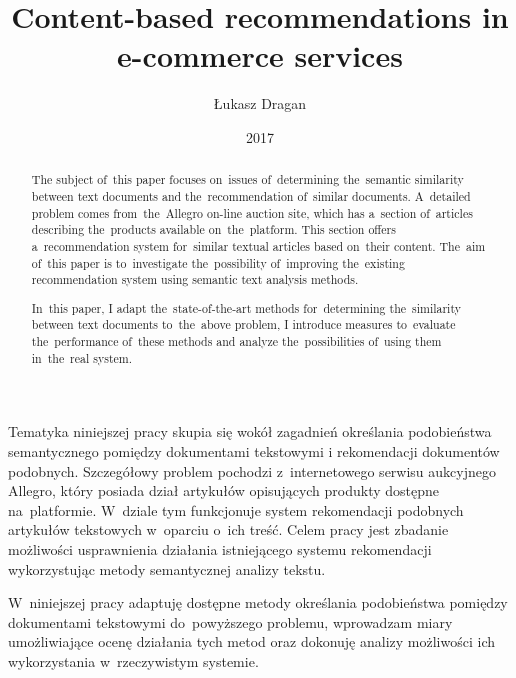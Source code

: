 \documentclass[pl]{minipw} %
\title{Content-based recommendations in e-commerce services} %
\author{Łukasz Dragan}
\date{2017}
\begin{document}
\sloppy






\setcounter{page}{1}


\begin{streszczenie}

	Tematyka niniejszej pracy skupia się wokół zagadnień określania podobieństwa semantycznego pomiędzy dokumentami tekstowymi i rekomendacji dokumentów podobnych. Szczegółowy problem pochodzi z~internetowego serwisu aukcyjnego Allegro, który posiada dział artykułów opisujących produkty dostępne na~platformie. W~dziale tym funkcjonuje system rekomendacji podobnych artykułów tekstowych w~oparciu o~ich treść. Celem pracy jest zbadanie możliwości usprawnienia działania istniejącego systemu rekomendacji wykorzystując metody semantycznej analizy tekstu.
	
	W~niniejszej pracy adaptuję dostępne metody określania podobieństwa pomiędzy dokumentami tekstowymi do~powyższego problemu, wprowadzam miary umożliwiające ocenę działania tych metod oraz dokonuję analizy możliwości ich wykorzystania w~rzeczywistym systemie.
	
\end{streszczenie}


\begin{abstract}

	The subject of~this paper focuses on~issues of~determining the~semantic similarity between text documents and the~recommendation of~similar documents. A~detailed problem comes from~the~Allegro on-line auction site, which has a~section of~articles describing the~products available on~the~platform. This section offers a~recommendation system for~similar textual articles based on~their content. The~aim of~this paper is to~investigate the~possibility of~improving the~existing recommendation system using semantic text analysis methods.
	
	In~this paper, I adapt the~state-of-the-art methods for~determining the~similarity between text documents to~the~above problem, I introduce measures to~evaluate the~performance of~these methods and analyze the~possibilities of~using them in~the~real system.
	
\end{abstract}
\end{document}
